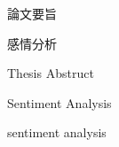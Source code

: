 \thispagestyle{empty}
\vspace*{2.0cm}

\begin{center}
\LARGE{論文要旨}
\end{center}
\vspace*{2.0cm}
感情分析
\newpage

\thispagestyle{empty}
\vspace*{2.0cm}

\begin{center}
\LARGE{Thesis Abstruct}
\end{center}
\vspace{3mm}

\begin{center}
\LARGE{Sentiment Analysis}
\end{center}

\vspace{20mm}
\setlength\parindent{2zw}
sentiment analysis
